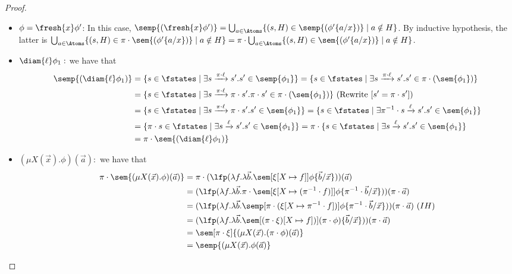 \begin{proof}
\begin{itemize}
		\item $\phi=\fresh{x}\phi'$:
		In this case, $\semp{(\fresh{x}\phi')} = \bigcup_{a\in\Atoms}\{(s, H) \in \semp{(\phi'\{a/x\})} \mid a \notin H\}$. 
		By inductive hypothesis, the latter is $\bigcup_{a\in\Atoms}\{(s, H) \in \pi \cdot \sem{(\phi'\{a/x\})} \mid a \notin H\}
				=\pi \cdot \bigcup_{a\in\Atoms}\{(s, H) \in \sem{(\phi'\{a/x\})} \mid a \notin H\}$.
		\item $\diam{\ell}\phi_1:$ we have that
		\begin{align*}
			\semp{(\diam{\ell}\phi_1)} &= \{s\in\fstates\mid\exists s\xrightarrow{\pi\cdot\ell} s' . s' \in \semp{\phi_1}\}
			= \{s\in\fstates\mid\exists s\xrightarrow{\pi\cdot\ell} s' . s' \in \pi\cdot(\sem{\phi_1})\}\\
			&= \{s\in\fstates\mid\exists s\xrightarrow{\pi\cdot\ell} \pi\cdot s' . \pi\cdot s' \in \pi\cdot(\sem{\phi_1})\}\ (\text{Rewrite}\ [s' = \pi\cdot s'])\\ 
			&= \{s\in\fstates\mid\exists s\xrightarrow{\pi\cdot\ell} \pi\cdot s' . s' \in \sem{\phi_1}\}
			= \{s\in\fstates\mid\exists \pi^{-1}\cdot s\xrightarrow{\ell} s' . s' \in \sem{\phi_1}\}\\
			&= \{\pi\cdot s\in\fstates\mid\exists s\xrightarrow{\ell} s' . s' \in \sem{\phi_1}\}
			= \pi\cdot\{s\in\fstates\mid\exists s\xrightarrow{\ell} s' . s' \in \sem{\phi_1}\}\\
			&= \pi\cdot\sem{(\diam{\ell}\phi_1)}
		\end{align*}
		\item $(\mu X(\vec x).\phi)(\vec a):$ we have that
    \begin{align*}
	\pi\cdot \sem{(\mu X(\vec x).\phi)(\vec a)} &= \pi\cdot(\lfp(\lambda f.\lambda\vec b. \sem[{\xi[X\mapsto f]}]{\phi\{\vec b/\vec x\}}))(\vec a)\\
	&= (\lfp(\lambda f.\lambda\vec b. \pi\cdot\sem[{\xi[X\mapsto (\pi^{-1}\cdot f)]}]{\phi\{\pi^{-1} \cdot \vec b/\vec x\}}))(\pi\cdot \vec a)\\
	&= (\lfp(\lambda f.\lambda\vec b. \semp[\pi\cdot(\xi{[X\mapsto \pi^{-1}\cdot f]})]{\phi\{\pi^{-1}\cdot \vec b / \vec x\}}))(\pi\cdot \vec a)\ (IH)\\
	&= (\lfp(\lambda f.\lambda\vec b. \sem[(\pi\cdot\xi){[X\mapsto f]})]{(\pi \cdot\phi)\{\vec b / \vec x\}}))(\pi\cdot \vec a)\\
	&= \sem[\pi\cdot\xi]{(\mu X(\vec x).(\pi\cdot\phi)(\vec a)}\\
	&= \semp{(\mu X(\vec x).\phi(\vec a)}
\end{align*}
		
	\end{itemize}
\end{proof}
